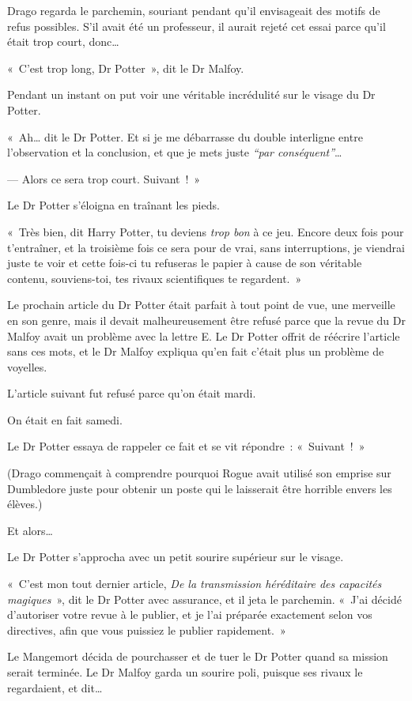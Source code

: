 Drago regarda le parchemin, souriant pendant qu'il envisageait des motifs de refus possibles. S'il avait été un professeur, il aurait rejeté cet essai parce qu'il était trop court, donc…

«~C'est trop long, Dr Potter~», dit le Dr Malfoy.

Pendant un instant on put voir une véritable incrédulité sur le visage du Dr Potter.

«~Ah… dit le Dr Potter. Et si je me débarrasse du double interligne entre l'observation et la conclusion, et que je mets juste \emph{“par conséquent”}…

--- Alors ce sera trop court. Suivant~!~»

Le Dr Potter s'éloigna en traînant les pieds.

«~Très bien, dit Harry Potter, tu deviens \emph{trop bon} à ce jeu. Encore deux fois pour t'entraîner, et la troisième fois ce sera pour de vrai, sans interruptions, je viendrai juste te voir et cette fois-ci tu refuseras le papier à cause de son véritable contenu, souviens-toi, tes rivaux scientifiques te regardent.~»

Le prochain article du Dr Potter était parfait à tout point de vue, une merveille en son genre, mais il devait malheureusement être refusé parce que la revue du Dr Malfoy avait un problème avec la lettre E\@. Le Dr Potter offrit de réécrire l'article sans ces mots, et le Dr Malfoy expliqua qu'en fait c'était plus un problème de voyelles.

L'article suivant fut refusé parce qu'on était mardi.

On était en fait samedi.

Le Dr Potter essaya de rappeler ce fait et se vit répondre~: «~Suivant~!~»

(Drago commençait à comprendre pourquoi Rogue avait utilisé son emprise sur Dumbledore juste pour obtenir un poste qui le laisserait être horrible envers les élèves.)

Et alors…

Le Dr Potter s'approcha avec un petit sourire supérieur sur le visage.

«~C'est mon tout dernier article, \emph{De la transmission héréditaire des capacités magiques}~», dit le Dr Potter avec assurance, et il jeta le parchemin. «~J'ai décidé d'autoriser votre revue à le publier, et je l'ai préparée exactement selon vos directives, afin que vous puissiez le publier rapidement.~»

Le Mangemort décida de pourchasser et de tuer le Dr Potter quand sa mission serait terminée. Le Dr Malfoy garda un sourire poli, puisque ses rivaux le regardaient, et dit…

